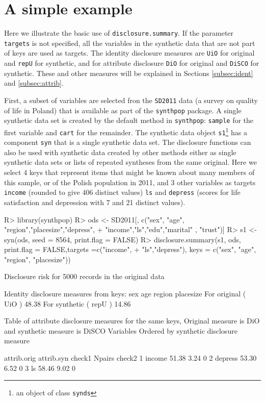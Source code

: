 \documentclass[12pt]{article}
\renewcommand{\baselinestretch}{1.5} %
\begin{document}
\section[A simple example]{A simple example}\label{sec:simpexamp}
Here we illustrate the basic use of \texttt{disclosure.summary}. If the parameter \texttt{targets} is not specified, all the variables in the synthetic data that are not part of keys are used as targets.
The identity disclosure measures are \texttt{UiO} for original and \texttt{repU} for synthetic, and for attribute disclosure \texttt{DiO} for original and \texttt{DiSCO} for synthetic. These and other measures will be explained in Sections \ref{subsec:ident} and \ref{subsec:attrib}.

First, a subset of variables are selected fron the \texttt{SD2011} data (a survey on quality of life in Poland) that is available as part of the \texttt{synthpop} package. A single synthetic data set is created by the default method in \texttt{synthpop}: \texttt{sample} for the first variable and \texttt{cart} for the remainder. The synthetic data object \texttt{s1}\footnote{an object of class \texttt{synds}} has a component \texttt{syn} that is a single synthetic data set. The disclosure functions can also be used with synthetic data created by other methods either as single synthetic data sets or lists of repeated syntheses from the same original. Here we select 4 keys that represent items that might be known
about many members of this sample, or of the Polish population in 2011, and 3 other variables as targets \texttt{income} (rounded to give 406 distinct values) \texttt{ls}  and \texttt{depress} (scores for life satisfaction  and depression with 7 and 21 distinct values).
\renewcommand{\baselinestretch}{1.0}
\begin{Schunk}
\begin{Sinput}
R> library(synthpop)
R> ods <- SD2011[, c("sex", "age",  "region","placesize","depress",
+                   "income","ls","edu","marital" , "trust")]
R> s1 <- syn(ods, seed = 8564, print.flag = FALSE)
R> disclosure.summary(s1, ods,  print.flag = FALSE,targets =c("income",
+  "ls","depress"), keys = c("sex", "age", "region", "placesize"))
\end{Sinput}
\begin{Soutput}
Disclosure risk for 5000 records in the original data

Identity disclosure measures
from keys: sex age region placesize 
For original  ( UiO )  48.38 %
For synthetic ( repU ) 14.86 %

Table of attribute disclosure measures for the same keys, 
Original measure is  DiO and synthetic measure is DiSCO 
Variables Ordered by synthetic disclosure measure

          attrib.orig attrib.syn check1 Npairs check2
1 income        51.38       3.24             0       
2 depress       53.30       6.52             0       
3 ls            58.46       9.02             0       
\end{Soutput}
\end{Schunk}
\end{document}
